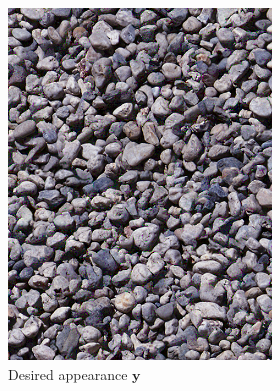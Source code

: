 \begin{figure}[]
    \centering    
    \begin{subfigure}{\textwidth}
        \centering
        \begin{subfigure}{0.2\textwidth}
            \centering
            \includegraphics[width=\textwidth]{images/04-experiment02/human/pebbles/target.jpg}
            \caption*{Desired appearance \(\bm{y}\)}
        \end{subfigure}
        \hfill
        \begin{subfigure}{0.78\textwidth}
            \centering
            \begin{subfigure}{0.32\textwidth}
                \centering
                \begin{tikzpicture}

\end{tikzpicture}
\end{subfigure}
\end{subfigure}
\end{subfigure}
\end{figure}
